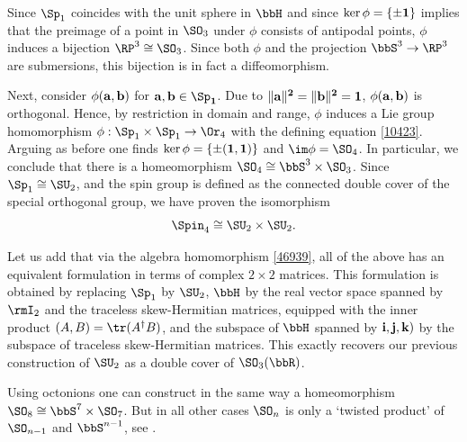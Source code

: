 \begin{example}
    Since $\Sp_1$ coincides with the unit sphere in $\bbH$ and since $\ker\phi=\{\pm\bf{1}\}$ implies that the preimage of a point in $\SO_3$ under $\phi$ consists of antipodal points, $\phi$ induces a bijection $\RP^3\cong \SO_3$. Since both $\phi$ and the projection $\bbS^3\to\RP^3$ are submersions, this bijection is in fact a diffeomorphism.

    Next, consider $\phi(\bf{a},\bf{b})$ for $\bf{a},\bf{b}\in\Sp_1$. Due to $\lVert \bf{a}\rVert^2=\lVert \bf{b}\rVert^2=1$, $\phi(\bf{a},\bf{b})$ is orthogonal. Hence, by restriction in domain and range, $\phi$ induces a Lie group homomorphism $\phi:\Sp_1\times\Sp_1\to \Or_4$ with the defining equation \eqref{10423}. Arguing as before one finds $\ker\phi=\{\pm(\bf{1},\bf{1})\}$ and $\im\phi=\SO_4$. In particular, we conclude that there is a homeomorphism $\SO_4\cong \bbS^3\times \SO_3$. Since $\Sp_1\cong \SU_2$, and the spin group is defined as the connected double cover of the special orthogonal group, we have proven the isomorphism 
    \[\Spin_4\cong \SU_2\times\SU_2.\]

    Let us add that via the algebra homomorphism \eqref{46939}, all of the above has an equivalent formulation in terms of complex $2\times 2$ matrices. This formulation is obtained by replacing $\Sp_1$ by $\SU_2$, $\bbH$ by the real vector space spanned by $\rmI_2$ and the traceless skew-Hermitian matrices, equipped with the inner product $(A,B)=\tr(A^\dagger B)$, and the subspace of $\bbH$ spanned by $\bf{i},\bf{j},\bf{k})$ by the subspace of traceless skew-Hermitian matrices. This exactly recovers our previous construction of $\SU_2$ as a double cover of $\SO_3(\bbR)$.
\end{example}

\begin{rem}
    Using octonions one can construct in the same way a homeomorphism $\SO_8\cong \bbS^7\times \SO_7$. But in all other cases $\SO_n$ is only a `twisted product' of $\SO_{n-1}$ and $\bbS^{n-1}$, see \cite[Cor.~4D.3]{Hatcher}.
\end{rem}





